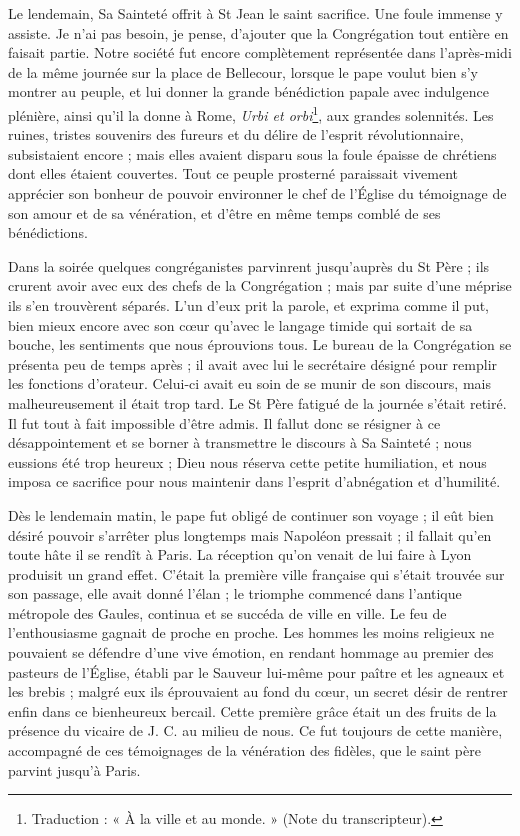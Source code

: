 Le lendemain, Sa Sainteté offrit à St Jean le saint sacrifice. Une foule immense y assiste. Je n'ai pas besoin, je pense, d'ajouter que la Congrégation tout entière en faisait partie. Notre société fut encore complètement représentée dans l'après-midi de la même journée sur la place de Bellecour, lorsque le pape voulut bien s'y montrer au peuple, et lui donner la grande bénédiction papale avec indulgence plénière, ainsi qu'il la donne à Rome, \textit{Urbi et orbi}\footnote{Traduction : « À la ville et au monde. » (Note du transcripteur).}, aux grandes solennités. Les ruines, tristes souvenirs des fureurs et du délire de l'esprit révolutionnaire, subsistaient encore ; mais elles avaient disparu sous la foule épaisse de chrétiens dont elles étaient couvertes. Tout ce peuple prosterné paraissait vivement apprécier son bonheur de pouvoir environner le chef de l'Église du témoignage de son amour et de sa vénération, et d'être en même temps comblé de ses bénédictions.

Dans la soirée quelques congréganistes parvinrent jusqu'auprès du St Père ; ils crurent avoir avec eux des chefs de la Congrégation ; mais par suite d'une méprise ils s'en trouvèrent séparés. L'un d'eux prit la parole,
et exprima comme il put, bien mieux encore avec son cœur qu'avec le langage timide qui sortait de sa bouche, les sentiments que nous éprouvions tous. Le bureau de la Congrégation se présenta peu de temps après ; il avait avec lui le secrétaire désigné pour remplir les fonctions d'orateur. Celui-ci avait eu soin de se munir de son discours, mais malheureusement il était trop tard. Le St Père fatigué de la journée s'était retiré. Il fut tout à fait impossible d'être admis. Il fallut donc se résigner à ce désappointement et se borner à transmettre le discours à Sa Sainteté ; nous eussions été trop heureux ; Dieu nous réserva cette petite humiliation, et nous imposa ce sacrifice pour nous maintenir dans l'esprit d'abnégation et d'humilité.

Dès le lendemain matin, le pape fut obligé de continuer son voyage ; il eût bien désiré pouvoir s'arrêter plus longtemps mais Napoléon pressait ; il fallait qu'en toute hâte il se rendît à Paris. La réception qu'on venait de lui faire à Lyon produisit un grand effet. C'était la première ville française qui s'était trouvée sur son passage, elle avait donné l'élan ; le triomphe commencé dans l'antique métropole des Gaules, continua et se succéda de ville en ville. Le feu de l'enthousiasme gagnait de proche en proche. Les hommes les moins religieux ne pouvaient se défendre d'une vive émotion, en rendant hommage au premier des pasteurs de l'Église, établi par le Sauveur lui-même pour paître et les agneaux et les brebis ; malgré eux ils éprouvaient au fond du cœur, un secret désir de rentrer enfin dans ce bienheureux bercail. Cette première grâce était un des fruits
de la présence du vicaire de J. C. au milieu de nous. Ce fut toujours de cette manière, accompagné de ces témoignages de la vénération des fidèles, que le saint père parvint jusqu'à Paris.

